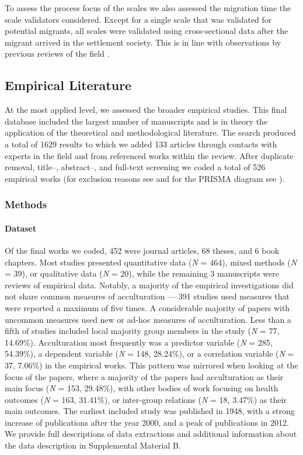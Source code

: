 To assess the process focus of the scales we also assessed the migration
time the scale validators considered. Except for a single scale that was
validated for potential migrants, all scales were validated using
cross-sectional data after the migrant arrived in the settlement
society. This is in line with observations by previous reviews of the
field \citep[e.g.,][]{Brown2011}.

\subsection{Empirical Literature}

At the most applied level, we assessed the broader empirical studies.
This final database included the largest number of manuscripts and is in
theory the application of the theoretical and methodological literature.
The search produced a total of 1629 results to which we added 133
articles through contacts with experts in the field and from referenced
works within the review. After duplicate removal, title--, abstract--,
and full-text screening we coded a total of 526 empirical works (for
exclusion reasons see  and for the PRISMA
diagram see ).

\subsubsection{Methods}

\paragraph{Dataset}

Of the final works we coded, 452 were journal articles, 68 theses, and 6
book chapters. Most studies presented quantitative data (\textit{N} =
464), mixed methods (\textit{N} = 39), or qualitative data (\textit{N} =
20), while the remaining 3 manuscripts were reviews of empirical data.
Notably, a majority of the empirical investigations did not share common
measures of acculturation --- 391 studies used measures that were
reported a maximum of five times. A considerable majority of papers with
uncommon measures used new or ad-hoc measures of acculturation. Less
than a fifth of studies included local majority group members in the
study (\textit{N} = 77, 14.69\%). Acculturation most frequently was a
predictor variable (\textit{N} = 285, 54.39\%), a dependent variable
(\textit{N} = 148, 28.24\%), or a correlation variable (\textit{N} = 37,
7.06\%) in the empirical works. This pattern was mirrored when looking
at the focus of the papers, where a majority of the papers had
acculturation as their main focus (\textit{N} = 153, 29.48\%), with
other bodies of work focusing on health outcomes (\textit{N} = 163,
31.41\%), or inter-group relations (\textit{N} = 18, 3.47\%) as their
main outcomes. The earliest included study was published in 1948, with a
strong increase of publications after the year 2000, and a peak of
publications in 2012. We provide full descriptions of data extractions
and additional information about the data description in Supplemental
Material B.

